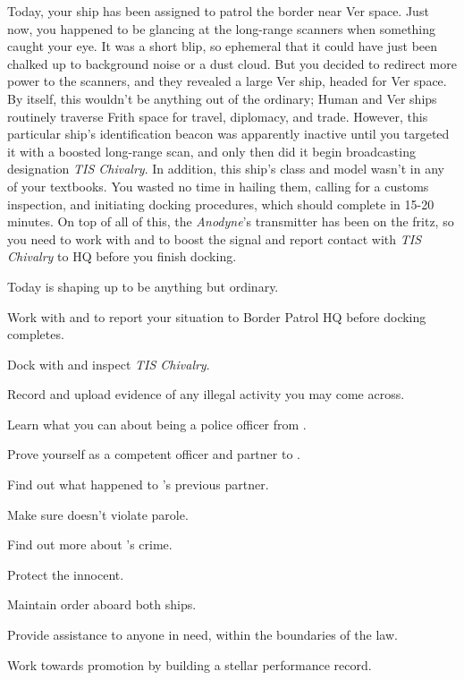 \documentclass[char]{guildcamp4}
\begin{document}
Today, your ship has been assigned to patrol the border near Ver space. Just now, you happened to be glancing at the long-range scanners when something caught your eye. It was a short blip, so ephemeral that it could have just been chalked up to background noise or a dust cloud. But you decided to redirect more power to the scanners, and they revealed a large Ver ship, headed for Ver space. By itself, this wouldn't be anything out of the ordinary; Human and Ver ships routinely traverse Frith space for travel, diplomacy, and trade. However, this particular ship's identification beacon was apparently inactive until you targeted it with a boosted long-range scan, and only then did it begin broadcasting designation \emph{TIS Chivalry}. In addition, this ship's class and model wasn't in any of your textbooks. You wasted no time in hailing them, calling for a customs inspection, and initiating docking procedures, which should complete in 15-20 minutes. On top of all of this, the \emph{Anodyne}'s transmitter has been on the fritz, so you need to work with \cCbad{} and \cPilot{} to boost the signal and report contact with \emph{TIS Chivalry} to HQ before you finish docking.

Today is shaping up to be anything but ordinary.

\begin{itemz}[Goals]
	\item Work with \cCbad{} and \cPilot{} to report your situation to Border Patrol HQ before docking completes.
	\item Dock with and inspect \emph{TIS Chivalry}.
	\item Record and upload evidence of any illegal activity you may come across.
	\item Learn what you can about being a police officer from \cCbad{}.
	\item Prove yourself as a competent officer and partner to \cCbad{}.
	\item Find out what happened to \cCbad{}'s previous partner.
	\item Make sure \cPilot{} doesn't violate \cPilot{\their} parole. 
	\item Find out more about \cPilot{}'s crime.
	\item Protect the innocent.
	\item Maintain order aboard both ships.
	\item Provide assistance to anyone in need, within the boundaries of the law. 
	\item Work towards promotion by building a stellar performance record.
\end{itemz}
\end{document}
